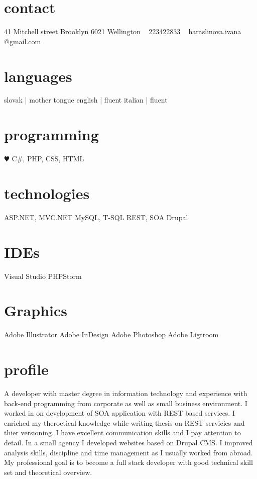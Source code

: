 \documentclass[]{friggeri-cv} %
\begin{document}


\begin{aside} %
\section{contact}
41 Mitchell street
Brooklyn
6021 Wellington
~
223422833
~
haraslinova.ivana
@gmail.com
\section{languages}
slovak | mother tongue
english | fluent
italian | fluent
\section{programming}
{\color{red} $\varheartsuit$} C\#, PHP, CSS, HTML
\section{technologies}
ASP.NET, MVC.NET 
MySQL, T-SQL
REST, SOA
Drupal
\section{IDEs}
Visual Studio
PHPStorm
\section{Graphics}
Adobe Illustrator
Adobe InDesign
Adobe Photoshop
Adobe Ligtroom
\end{aside}


\section{profile}
A developer with master degree in information technology and experience with back-end programming from corporate as well as small business environment. 
I worked in on development of SOA application with REST based services. I enriched my theroetical knowledge while writing thesis on REST servicies and thier versioning. I have excellent communication skills and I pay attention to detail. In a small agency I developed websites based on Drupal CMS. I improved analysis skills, discipline and time management as I usually worked from abroad. My professional goal is to become a full stack developer with good technical skill set and theoretical overview.
\end{document}
